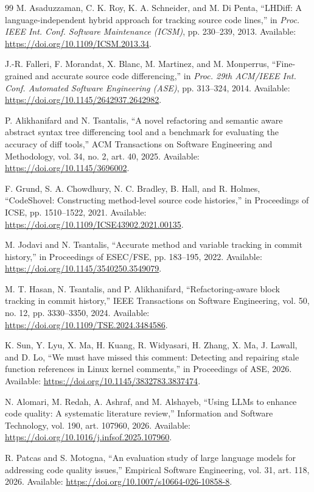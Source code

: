 \documentclass[10pt,conference,letterpaper]{IEEEtran}
\begin{document}
\begin{thebibliography}{99}
 M. Asaduzzaman, C. K. Roy, K. A. Schneider, and M. Di Penta, “LHDiff: A language-independent hybrid approach for tracking source code lines,” in \emph{Proc. IEEE Int. Conf. Software Maintenance (ICSM)}, pp. 230--239, 2013. Available: \url{https://doi.org/10.1109/ICSM.2013.34}.

 J.-R. Falleri, F. Morandat, X. Blanc, M. Martinez, and M. Monperrus, “Fine-grained and accurate source code differencing,” in \emph{Proc. 29th ACM/IEEE Int. Conf. Automated Software Engineering (ASE)}, pp. 313--324, 2014. Available: \url{https://doi.org/10.1145/2642937.2642982}.

 P. Alikhanifard and N. Tsantalis, “A novel refactoring and semantic aware abstract syntax tree differencing tool and a benchmark for evaluating the accuracy of diff tools,” ACM Transactions on Software Engineering and Methodology, vol. 34, no. 2, art. 40, 2025. Available: \url{https://doi.org/10.1145/3696002}.

 F. Grund, S. A. Chowdhury, N. C. Bradley, B. Hall, and R. Holmes, “CodeShovel: Constructing method-level source code histories,” in Proceedings of ICSE, pp. 1510–1522, 2021. Available: \url{https://doi.org/10.1109/ICSE43902.2021.00135}.

 M. Jodavi and N. Tsantalis, “Accurate method and variable tracking in commit history,” in Proceedings of ESEC/FSE, pp. 183–195, 2022. Available: \url{https://doi.org/10.1145/3540250.3549079}.

 M. T. Hasan, N. Tsantalis, and P. Alikhanifard, “Refactoring-aware block tracking in commit history,” IEEE Transactions on Software Engineering, vol. 50, no. 12, pp. 3330–3350, 2024. Available: \url{https://doi.org/10.1109/TSE.2024.3484586}.

 K. Sun, Y. Lyu, X. Ma, H. Kuang, R. Widyasari, H. Zhang, X. Ma, J. Lawall, and D. Lo, “We must have missed this comment: Detecting and repairing stale function references in Linux kernel comments,” in Proceedings of ASE, 2026. Available: \url{https://doi.org/10.1145/3832783.3837474}.

 N. Alomari, M. Redah, A. Ashraf, and M. Alshayeb, “Using LLMs to enhance code quality: A systematic literature review,” Information and Software Technology, vol. 190, art. 107960, 2026. Available: \url{https://doi.org/10.1016/j.infsof.2025.107960}.

 R. Patcas and S. Motogna, “An evaluation study of large language models for addressing code quality issues,” Empirical Software Engineering, vol. 31, art. 118, 2026. Available: \url{https://doi.org/10.1007/s10664-026-10858-8}.


\end{thebibliography}
\end{document}
